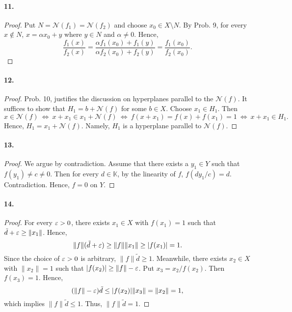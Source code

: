   \paragraph{11.}
  \begin{proof}
    Put $N=\mathcal{N}(f_1)=\mathcal{N}(f_2)$ and choose $x_0\in X\setminus N$.
    By Prob. 9, for every $x\notin N$, $x=\alpha x_0+y$ where $y\in N$ and 
    $\alpha\ne 0$. Hence, 
    \[
      \frac{f_1(x)}{f_2(x)} = 
      \frac{\alpha f_1(x_0)+f_1(y)}{\alpha f_2(x_0)+f_2(y)} =
      \frac{f_1(x_0)}{f_2(x_0)}.
    \]
  \end{proof}

  \paragraph{12.}
  \begin{proof}
    Prob. 10, justifies the discussion on hyperplanes parallel to the 
    $\mathcal{N}(f)$. It suffices to show that $H_1=b+\mathcal{N}(f)$ for some 
    $b\in X$. Choose $x_1\in H_1$. Then
    \[
      x\in \mathcal{N}(f) \:\Leftrightarrow\:
      x+x_1\in x_1+\mathcal{N}(f) \:\Leftrightarrow\:
      f(x+x_1) = f(x)+f(x_1) = 1 \:\Leftrightarrow\:
      x+x_1\in H_1.
    \]
    Hence, $H_1=x_1+\mathcal{N}(f)$. Namely, $H_1$ is a hyperplane parallel to
    $\mathcal{N}(f)$.
  \end{proof}

  \paragraph{13.}
  \begin{proof}
    We argue by contradiction. Assume that there exists a $y_1\in Y$ such that 
    $f(y_1)\ne c\ne 0$. Then for every $d\in\mathbb{K}$, by the linearity of 
    $f$, $f(dy_1/c) = d$. Contradiction. Hence, $f=0$ on $Y$.
  \end{proof}

  \paragraph{14.}
  \begin{proof}
    For every $\varepsilon>0$, there exists $x_1\in X$ with $f(x_1)=1$ such that 
    $\tilde{d}+\varepsilon\ge\|x_1\|$. Hence, 
    \[
      \|f\|(\tilde{d}+\varepsilon)\ge\|f\|\|x_1\| \ge |f(x_1)| = 1.
    \]
    Since the choice of $\varepsilon>0$ is arbitrary, $\|f\|\tilde{d}\ge 1$. Meanwhile,
    there exists $x_2\in X$ with $\|x_2\|=1$ such that $|f(x_2)|\ge \|f\|-\varepsilon$.
    Put $x_3 = x_2/f(x_2)$. Then $f(x_3)=1$. Hence,
    \[
      (\|f\|-\varepsilon)\tilde{d} \le |f(x_2)|\|x_3\| = \|x_2\| = 1,
    \]
    which implies $\|f\|\tilde{d}\le 1$. Thus, $\|f\|\tilde{d}=1$.
  \end{proof}

